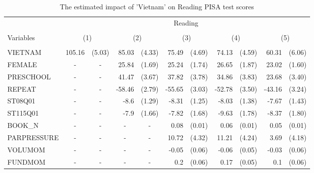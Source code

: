 \documentclass[10pt]{article}
\begin{document}
	\begin{table}[htbp]
		\footnotesize
		\def\arraystretch{1}
		\def\tabcolsep{4}
		\centering
		\caption{The estimated impact of 'Vietnam' on Reading PISA test scores}
     \begin{tabular}{lrlrlrlrlrl}
     	\toprule
     	\midrule
     	& \multicolumn{10}{c}{Reading} \\
		\cline{2-11} \\
     	Variables & \multicolumn{2}{c}{(1)} & \multicolumn{2}{c}{(2)} & \multicolumn{2}{c}{(3)} & \multicolumn{2}{c}{(4)} & \multicolumn{2}{c}{(5)} \\
     	\hline
     	&       &       &       &       &       &       &       &       &       &  \\
     	VIETNAM & 105.16 & (5.03) & 85.03 & (4.33) & 75.49 & (4.69) & 74.13 & (4.59) & 60.31 & (6.06) \\[0.2em]
     	FEMALE & \multicolumn{1}{c}{-} & \multicolumn{1}{c}{-} & 25.84 & (1.69) & 25.24 & (1.74) & 26.65 & (1.87) & 23.02 & (1.60) \\[0.2em]
     	PRESCHOOL & \multicolumn{1}{c}{-} & \multicolumn{1}{c}{-} & 41.47 & (3.67) & 37.82 & (3.78) & 34.86 & (3.83) & 23.68 & (3.40) \\[0.2em]
     	REPEAT & \multicolumn{1}{c}{-} & \multicolumn{1}{c}{-} & -58.46 & (2.79) & -55.65 & (3.03) & -52.78 & (3.50) & -43.16 & (3.24) \\[0.2em]
     	ST08Q01 & \multicolumn{1}{c}{-} & \multicolumn{1}{c}{-} & -8.6  & (1.29) & -8.31 & (1.25) & -8.03 & (1.38) & -7.67 & (1.43) \\[0.2em]
     	ST115Q01 & \multicolumn{1}{c}{-} & \multicolumn{1}{c}{-} & -7.9  & (1.66) & -7.82 & (1.68) & -9.63 & (1.78) & -8.37 & (1.80) \\[0.2em]
     	BOOK\_N & \multicolumn{1}{c}{-} & \multicolumn{1}{c}{-} & \multicolumn{1}{c}{-} & \multicolumn{1}{c}{-} & 0.08  & (0.01) & 0.06  & (0.01) & 0.05  & (0.01) \\[0.2em]
     	PARPRESSURE & \multicolumn{1}{c}{-} & \multicolumn{1}{c}{-} & \multicolumn{1}{c}{-} & \multicolumn{1}{c}{-} & 10.72 & (4.32) & 11.21 & (4.24) & 3.69  & (4.18) \\[0.2em]
     	VOLUMOM & \multicolumn{1}{c}{-} & \multicolumn{1}{c}{-} & \multicolumn{1}{c}{-} & \multicolumn{1}{c}{-} & -0.05 & (0.06) & -0.06 & (0.05) & -0.03 & (0.06) \\[0.2em]
     	FUNDMOM & \multicolumn{1}{c}{-} & \multicolumn{1}{c}{-} & \multicolumn{1}{c}{-} & \multicolumn{1}{c}{-} & 0.2   & (0.06) & 0.17  & (0.05) & 0.1   & (0.06) \\[0.2em]

\end{tabular}
\end{table}
\end{document}
